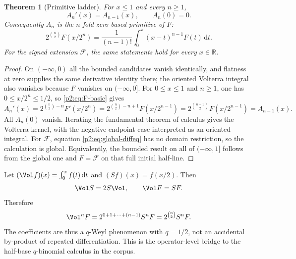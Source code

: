 \documentclass[11pt,oneside]{article}
\newtheorem{theorem}{Theorem}[section]
\theoremstyle{definition}
\theoremstyle{remark}
\newcommand{\R}{\mathbb R}
\newcommand{\dd}{\,\mathrm d}
\newcommand{\1}{\mathbf 1}
\begin{document}
\begin{theorem}[Primitive ladder]
\label{p2:thm:primitive-ladder}
For $x\le1$ and every $n\ge1$,
\begin{equation}
 A_n'(x)=A_{n-1}(x),\qquad A_n(0)=0.                       \label{p2:eq:ladder-derivative}
\end{equation}
Consequently $A_n$ is the $n$-fold zero-based primitive of $F$:
\begin{equation}
 \boxed{
 2^{\binom n2}F(x/2^n)
 =\frac1{(n-1)!}\int_0^x(x-t)^{n-1}F(t)\dd t.}            \label{p2:eq:volterra-ladder}
\end{equation}
For the signed extension $\mathcal F$, the same statements hold for every
$x\in\R$.
\end{theorem}

\begin{proof}
On $(-\infty,0)$ all the bounded candidates vanish identically, and flatness
at zero supplies the same derivative identity there; the oriented Volterra
integral also vanishes because $F$ vanishes on $(-\infty,0]$.  For
$0\le x\le1$ and $n\ge1$, one has $0\le x/2^n\le1/2$, so
\eqref{p2:eq:F-basic} gives
\[
 A_n'(x)=2^{\binom n2-n}F'(x/2^n)
 =2^{\binom n2-n+1}F(x/2^{n-1})
 =2^{\binom{n-1}{2}}F(x/2^{n-1})=A_{n-1}(x).
\]
All $A_n(0)$ vanish.  Iterating the fundamental theorem of calculus gives the
Volterra kernel, with the negative-endpoint case interpreted as an oriented
integral.  For $\mathcal F$, equation \eqref{p2:eq:global-diffeq} has no domain
restriction, so the calculation is global.  Equivalently, the bounded result
on all of $(-\infty,1]$ follows from the global one and
$F=\mathcal F$ on that full initial half-line.
\end{proof}

\begin{remark}
Let $(\Vol f)(x)=\int_0^xf(t)\dd t$ and $(Sf)(x)=f(x/2)$.  Then
\begin{equation}
 \Vol S=2S\Vol,\qquad \Vol F=SF.                           \label{p2:eq:q-weyl}
\end{equation}
Therefore
\begin{equation}
 \Vol^nF=2^{0+1+\cdots+(n-1)}S^nF
 =2^{\binom n2}S^nF.                                      \label{p2:eq:q-weyl-ladder}
\end{equation}
The coefficients are thus a $q$-Weyl phenomenon with $q=1/2$, not an accidental
by-product of repeated differentiation.  This is the operator-level bridge to
the half-base $q$-binomial calculus in the corpus.
\end{remark}
\end{document}
